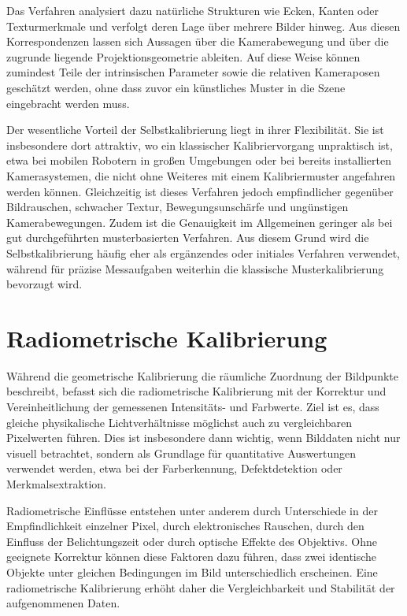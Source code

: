 \documentclass[12pt,a4paper,parskip=half]{scrartcl}
\begin{document}
Das Verfahren analysiert dazu natürliche Strukturen wie Ecken, Kanten oder Texturmerkmale und verfolgt deren Lage über mehrere Bilder hinweg. Aus diesen Korrespondenzen lassen sich Aussagen über die Kamerabewegung und über die zugrunde liegende Projektionsgeometrie ableiten. Auf diese Weise können zumindest Teile der intrinsischen Parameter sowie die relativen Kameraposen geschätzt werden, ohne dass zuvor ein künstliches Muster in die Szene eingebracht werden muss.

Der wesentliche Vorteil der Selbstkalibrierung liegt in ihrer Flexibilität. Sie ist insbesondere dort attraktiv, wo ein klassischer Kalibriervorgang unpraktisch ist, etwa bei mobilen Robotern in großen Umgebungen oder bei bereits installierten Kamerasystemen, die nicht ohne Weiteres mit einem Kalibriermuster angefahren werden können. Gleichzeitig ist dieses Verfahren jedoch empfindlicher gegenüber Bildrauschen, schwacher Textur, Bewegungsunschärfe und ungünstigen Kamerabewegungen. Zudem ist die Genauigkeit im Allgemeinen geringer als bei gut durchgeführten musterbasierten Verfahren. Aus diesem Grund wird die Selbstkalibrierung häufig eher als ergänzendes oder initiales Verfahren verwendet, während für präzise Messaufgaben weiterhin die klassische Musterkalibrierung bevorzugt wird.

\section{Radiometrische Kalibrierung}
Während die geometrische Kalibrierung die räumliche Zuordnung der Bildpunkte beschreibt, befasst sich die radiometrische Kalibrierung mit der Korrektur und Vereinheitlichung der gemessenen Intensitäts- und Farbwerte. Ziel ist es, dass gleiche physikalische Lichtverhältnisse möglichst auch zu vergleichbaren Pixelwerten führen. Dies ist insbesondere dann wichtig, wenn Bilddaten nicht nur visuell betrachtet, sondern als Grundlage für quantitative Auswertungen verwendet werden, etwa bei der Farberkennung, Defektdetektion oder Merkmalsextraktion.

Radiometrische Einflüsse entstehen unter anderem durch Unterschiede in der Empfindlichkeit einzelner Pixel, durch elektronisches Rauschen, durch den Einfluss der Belichtungszeit oder durch optische Effekte des Objektivs. Ohne geeignete Korrektur können diese Faktoren dazu führen, dass zwei identische Objekte unter gleichen Bedingungen im Bild unterschiedlich erscheinen. Eine radiometrische Kalibrierung erhöht daher die Vergleichbarkeit und Stabilität der aufgenommenen Daten.
\end{document}
